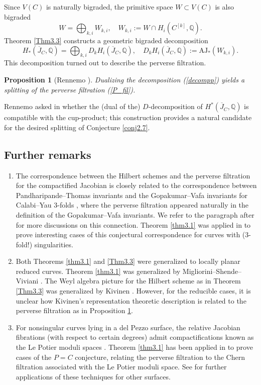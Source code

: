 \documentclass{pspum-l}
\theoremstyle{plain}
\newtheorem{prop}[thm]{Proposition}
\theoremstyle{definition}
\theoremstyle{remark}
\newcommand{\BQ}{{\mathbb{Q}}}
\begin{document}
Since $V(C)$ is naturally bigraded, the primitive space $W \subset V(C)$ is also bigraded
\[
W = \bigoplus_{k,i} W_{k,i}, \quad W_{k,i}:= W\cap H_{i}(C^{[k]}, \BQ).
\]
Theorem \ref{Thm3.3} constructs a geometric bigraded decomposition 
\begin{equation}\label{decompp}
H_*(\overline{J}_C, \BQ)= \bigoplus_{k,i} D_kH_i(\overline{J}_C, \BQ),\quad D_kH_i(\overline{J}_C, \BQ):= \mathrm{AJ}_* \left(W_{k,i} \right).
\end{equation}
This decomposition turned out to describe the perverse filtration.


\begin{prop}[Rennemo \cite{R}]\label{prop3.4}
   Dualizing the decomposition (\ref{decompp}) yields a splitting of the perverse filtration (\ref{P_fil}).
\end{prop}


Rennemo asked in \cite[Question 1.4]{R} whether the (dual of the) $D$-decomposition of $H^*(\overline{J}_C, \BQ)$ is compatible with the cup-product; this construction provides a natural candidate for the desired splitting of Conjecture \ref{conj2.7}.

\subsection{Further remarks}
\begin{enumerate}
    \item[(1)] The correspondence between the Hilbert schemes and the perverse filtration for the compactified Jacobian is closely related to the correspondence between Pandharipande--Thomas invariants and the Gopakumar--Vafa invariants for Calabi--Yau 3-folds \cite{HST, MT}, where the perverse filtration appeared naturally in the definition of the Gopakumar--Vafa invariants. We refer to the paragraph after \cite[Corollary 2]{MS} for more discussions on this connection. Theorem \ref{thm3.1} was applied in  \cite{MT,DK} to prove interesting cases of this conjectural correspondence for curves with (3-fold!) singularities. 
    \item[(2)] Both Theorems \ref{thm3.1} and \ref{Thm3.3} were generalized to locally planar reduced curves. Theorem \ref{thm3.1} was generalized by Migliorini--Shende--Viviani \cite{MSV}. The Weyl algebra picture for the Hilbert scheme as in Theorem \ref{Thm3.3} was generalized by Kivinen \cite{K}. However, for the reducible cases, it is unclear how Kivinen's representation theoretic description is related to the perverse filtration as in Proposition \ref{prop3.4}.
    \item[(3)] For nonsingular curves lying in a del Pezzo surface, the relative Jacobian fibrations (with respect to certain degrees) admit compactifications known as the Le Potier moduli spaces \cite{LP}. Theorem \ref{thm3.1} has been applied in \cite{PSSZ} to prove cases of the $P=C$ conjecture, relating the perverse filtration to the Chern filtration associated with the Le Potier moduli space. See \cite{SZ} for further applications of these techniques for other surfaces.
\end{enumerate}
\end{document}

